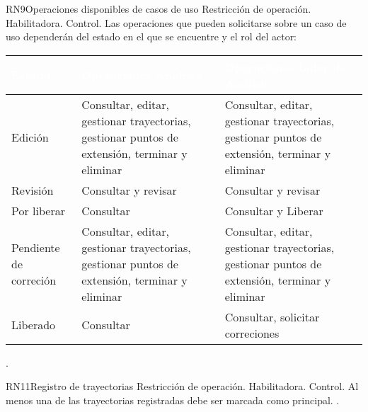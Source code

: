 \begin{BussinesRule}{RN9}{Operaciones disponibles de casos de uso} 
	\BRitem[Tipo:] Restricción de operación. 
	\BRitem[Clase:] Habilitadora. 
	\BRitem[Nivel:] Control. %
	\BRitem[Descripción:] Las operaciones que pueden solicitarse sobre un caso de uso dependerán del estado en el que se encuentre y el rol del actor:
	
	\begin{table}[H]
		\centering
		\begin{tabular}{|p{5cm}| p{5cm}| p{5cm}|}
			\hline
			\rowcolor{blue} \textcolor{white}{\textbf{Estado}} & \textcolor{white}{\textbf{Operaciones Analista}} & \textcolor{white}{\textbf{Operaciones Líder de Análisis}} \\
			\hline
			Edición & Consultar, editar, gestionar trayectorias, gestionar puntos de extensión, terminar y eliminar & Consultar, editar, gestionar trayectorias, gestionar puntos de extensión, terminar y eliminar \\
			\hline
			Revisión & Consultar y revisar & Consultar y revisar\\
			\hline
			Por liberar & Consultar & Consultar y Liberar\\
			\hline
			Pendiente de correción & Consultar, editar, gestionar trayectorias, gestionar puntos de extensión, terminar y eliminar & Consultar, editar, gestionar trayectorias, gestionar puntos de extensión, terminar y eliminar\\
			\hline
			Liberado & Consultar & Consultar, solicitar correciones\\
			\hline
		\end{tabular}
	\end{table}

	 \UCref{}{}.
	
\end{BussinesRule}

	\begin{BussinesRule}{RN11}{Registro de trayectorias} 
		\BRitem[Tipo:] Restricción de operación. 
		\BRitem[Clase:] Habilitadora. 
		\BRitem[Nivel:] Control. %
		\BRitem[Descripción:] Al menos una de las trayectorias registradas debe ser marcada como principal.
		 \UCref{}{}. 
	\end{BussinesRule}

